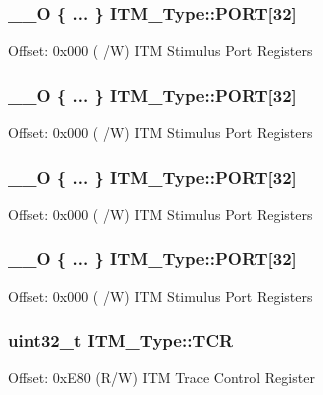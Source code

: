 \subsubsection[{\texorpdfstring{P\+O\+RT}{PORT}}]{\setlength{\rightskip}{0pt plus 5cm}\+\_\+\+\_\+O \{ ... \}    I\+T\+M\+\_\+\+Type\+::\+P\+O\+RT\mbox{[}32\mbox{]}}\hypertarget{struct_i_t_m___type_a7493d5a966acf6bd76f0ec040b56d39c}{}\label{struct_i_t_m___type_a7493d5a966acf6bd76f0ec040b56d39c}
Offset\+: 0x000 ( /W) I\+TM Stimulus Port Registers 
\subsubsection[{\texorpdfstring{P\+O\+RT}{PORT}}]{\setlength{\rightskip}{0pt plus 5cm}\+\_\+\+\_\+O \{ ... \}    I\+T\+M\+\_\+\+Type\+::\+P\+O\+RT\mbox{[}32\mbox{]}}\hypertarget{struct_i_t_m___type_a474e382ac2623a76ffaba9da1db49500}{}\label{struct_i_t_m___type_a474e382ac2623a76ffaba9da1db49500}
Offset\+: 0x000 ( /W) I\+TM Stimulus Port Registers 
\subsubsection[{\texorpdfstring{P\+O\+RT}{PORT}}]{\setlength{\rightskip}{0pt plus 5cm}\+\_\+\+\_\+O \{ ... \}    I\+T\+M\+\_\+\+Type\+::\+P\+O\+RT\mbox{[}32\mbox{]}}\hypertarget{struct_i_t_m___type_a0d1fcd0ca8f9c150ae7ff8c26e58994d}{}\label{struct_i_t_m___type_a0d1fcd0ca8f9c150ae7ff8c26e58994d}
Offset\+: 0x000 ( /W) I\+TM Stimulus Port Registers 
\subsubsection[{\texorpdfstring{P\+O\+RT}{PORT}}]{\setlength{\rightskip}{0pt plus 5cm}\+\_\+\+\_\+O \{ ... \}    I\+T\+M\+\_\+\+Type\+::\+P\+O\+RT\mbox{[}32\mbox{]}}\hypertarget{struct_i_t_m___type_afada5e124d80a9dc429deaef5416bf63}{}\label{struct_i_t_m___type_afada5e124d80a9dc429deaef5416bf63}
Offset\+: 0x000 ( /W) I\+TM Stimulus Port Registers 
\subsubsection[{\texorpdfstring{T\+CR}{TCR}}]{ uint32\+\_\+t I\+T\+M\+\_\+\+Type\+::\+T\+CR}\hypertarget{struct_i_t_m___type_a58f169e1aa40a9b8afb6296677c3bb45}{}\label{struct_i_t_m___type_a58f169e1aa40a9b8afb6296677c3bb45}
Offset\+: 0x\+E80 (R/W) I\+TM Trace Control Register 
